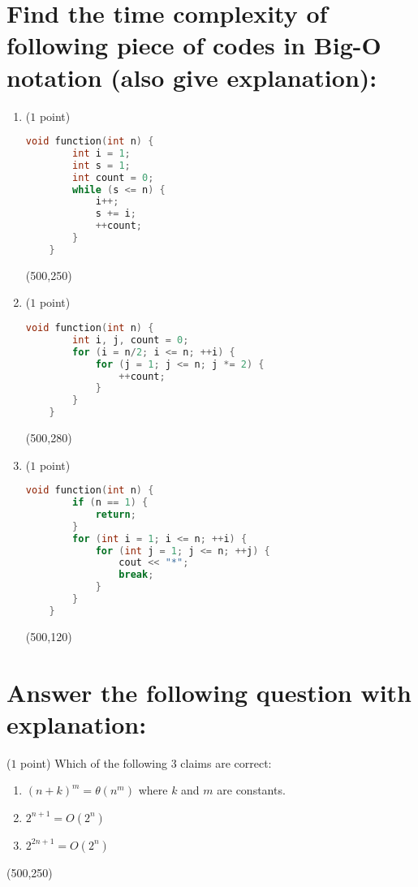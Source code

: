 \documentclass[14pt]{article}
\begin{document}
\section{Find the time complexity of following piece of codes in Big-O notation (also give explanation):}
\begin{enumerate}[label=\alph*)]
    \item ($1$ point)
    
    \begin{lstlisting}[language=C++, title={Part (a)}]
    void function(int n) {
        int i = 1;
        int s = 1;
        int count = 0;
        while (s <= n) {
            i++;
            s += i;
            ++count;
        }
    }
    \end{lstlisting}
    \framebox(500,250){}
    
    \item ($1$ point)
    \begin{lstlisting}[language=C++, title={Part (b)}]
    void function(int n) {
        int i, j, count = 0;
        for (i = n/2; i <= n; ++i) {
            for (j = 1; j <= n; j *= 2) {
                ++count;
            }
        }
    }
    \end{lstlisting}
    \framebox(500,280){}
    
    \item ($1$ point)
    \begin{lstlisting}[language=C++, title={Part (c)}]
    void function(int n) {
        if (n == 1) {
            return;
        }
        for (int i = 1; i <= n; ++i) {
            for (int j = 1; j <= n; ++j) {
                cout << "*";
                break;
            }
        }
    }
    \end{lstlisting}
    \framebox(500,120){}
\end{enumerate}

\section{Answer the following question with explanation:}
($1$ point) Which of the following 3 claims are correct:

\begin{enumerate}
    \item $(n + k)^{m} = \theta(n^m)$ where $k$ and $m$ are constants.
    \item $2^{n + 1} = O(2^{n})$
    \item $2^{2n + 1} = O(2^{n})$
\end{enumerate}

\framebox(500,250){}
\end{document}
